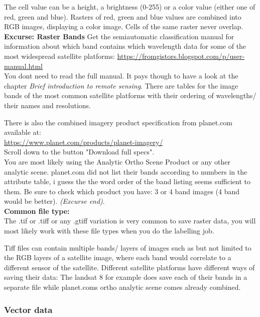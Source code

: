 \documentclass[12pt,a4paper]{scrartcl}
\begin{document}
The cell value can be a height, a brightness (0-255) or a color value (either one of red, green and blue).
Rasters of red, green and blue values are combined into RGB images, displaying a color image.  
Cells of the same raster never overlap. \\

\textbf{Excurse: Raster Bands} \newline
Get the semiautomatic classification manual for information about which band contains which wavelength data for 
some of the most widespread satellite platforms: 
\url{https://fromgistors.blogspot.com/p/user-manual.html}\\

You dont need to read the full manual. 
It pays though to have a look at the chapter \textit{Brief introduction to remote sensing}.
There are tables for the image bands of the most common satellite platforms with their ordering of wavelengths/ their names and resolutions.

There is also the combined imagery product specification from planet.com available at: \\
\url{https://www.planet.com/products/planet-imagery/} \\
Scroll down to the button "Download full specs". \\
You are most likely using the Analytic Ortho Scene Product or any other analytic scene.
planet.com did not list their bands according to numbers in the attribute table, i guess the the word order of the band listing seems sufficient to them.
Be sure to check which product you have: 3 or 4 band images (4 band would be better).  
\textit{(Excurse end)}. \\

\textbf{Common file type:} \\

The .tif or .tiff or any .gtiff variation is very common to save raster data, you will most likely work with these file types when you do the labelling job.  

Tiff files can contain multiple bands/ layers of images such as but not limited to the RGB layers of a satellite image,
where each band would correlate to a different sensor of the satellite.
Different satellite platforms have different ways of saving their data: 
The landsat 8 for example does save each of their bands in a separate file while planet.coms ortho analytic scene comes already combined. 

\subsubsection{Vector data}
\end{document}
